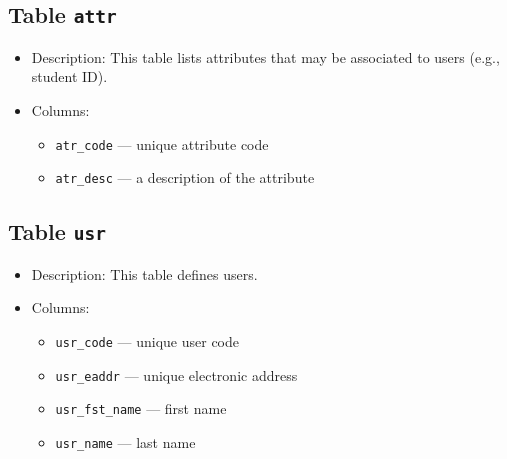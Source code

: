 \subsection{Table \texttt{attr}}
\begin{itemize}[itemsep=0pt,parsep=0pt,topsep=0pt,partopsep=0pt]
\item Description: This table lists attributes that may be associated to
           users (e.g., student ID).
\item Columns:
\begin{itemize}[itemsep=0pt,parsep=0pt,topsep=0pt,partopsep=0pt]
\item\texttt{atr\_code} --- unique attribute code
\item\texttt{atr\_desc} --- a description of the attribute
\end{itemize}
\end{itemize}
\subsection{Table \texttt{usr}}
\begin{itemize}[itemsep=0pt,parsep=0pt,topsep=0pt,partopsep=0pt]
\item Description: This table defines users.
\item Columns:
\begin{itemize}[itemsep=0pt,parsep=0pt,topsep=0pt,partopsep=0pt]
\item\texttt{usr\_code} --- unique user code
\item\texttt{usr\_eaddr} --- unique electronic address
\item\texttt{usr\_fst\_name} --- first name
\item\texttt{usr\_name} --- last name
\end{itemize}
\end{itemize}
